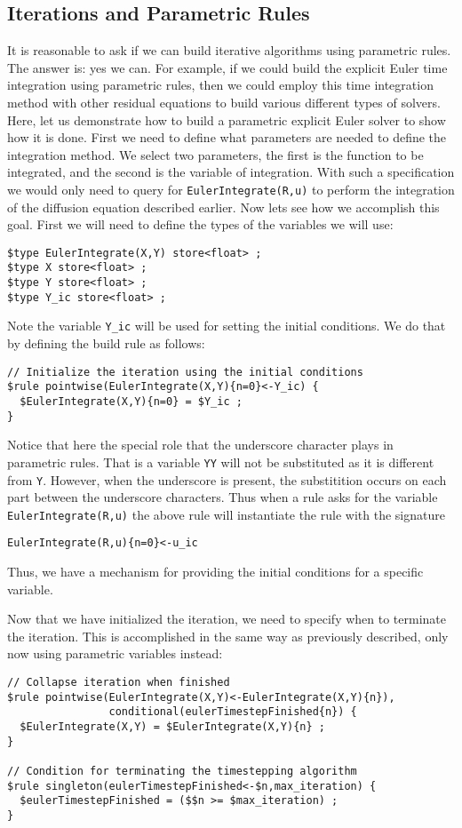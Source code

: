 \documentclass[10pt,epsf]{book}
\begin{document}
\subsection{Iterations and Parametric Rules}

It is reasonable to ask if we can build iterative algorithms using
parametric rules.  The answer is: yes we can.  For example, if we could
build the explicit Euler time integration using parametric rules, then
we could employ this time integration method with other residual
equations to build various different types of solvers.  Here, let us
demonstrate how to build a parametric explicit Euler solver to show
how it is done.  First we need to define what parameters are needed to
define the integration method.  We select two parameters, the first is
the function to be integrated, and the second is the variable of
integration.  With such a specification we would only need to query
for {\tt EulerIntegrate(R,u)} to perform the integration of the
diffusion equation described earlier.  Now lets see how we accomplish
this goal.  First we will need to define the types of the variables we
will use:

\begin{verbatim}
$type EulerIntegrate(X,Y) store<float> ;
$type X store<float> ;
$type Y store<float> ;
$type Y_ic store<float> ;
\end{verbatim}

Note the variable {\tt Y\_ic} will be used for setting the initial
conditions.  We do that by defining the build rule as follows:
\begin{verbatim}
// Initialize the iteration using the initial conditions
$rule pointwise(EulerIntegrate(X,Y){n=0}<-Y_ic) {
  $EulerIntegrate(X,Y){n=0} = $Y_ic ;
}
\end{verbatim}
Notice that here the special role that the underscore character plays
in parametric rules.  That is a variable {\tt YY} will not be
substituted as it is different from {\tt Y}.  However, when the
underscore is present, the substitition occurs on each part between
the underscore characters.  Thus when a rule asks for the variable
{\tt EulerIntegrate(R,u)} the above rule will instantiate the rule
with the signature
\begin{verbatim}
EulerIntegrate(R,u){n=0}<-u_ic
\end{verbatim}
Thus, we have a mechanism for providing the initial conditions for a
specific variable.

Now that we have initialized the iteration, we need to specify when to
terminate the iteration.  This is accomplished in the same way as
previously described, only now using parametric variables instead:
\begin{verbatim}
// Collapse iteration when finished
$rule pointwise(EulerIntegrate(X,Y)<-EulerIntegrate(X,Y){n}),
                conditional(eulerTimestepFinished{n}) {
  $EulerIntegrate(X,Y) = $EulerIntegrate(X,Y){n} ;
}

// Condition for terminating the timestepping algorithm
$rule singleton(eulerTimestepFinished<-$n,max_iteration) {
  $eulerTimestepFinished = ($$n >= $max_iteration) ;
}
\end{verbatim}
\end{document}

